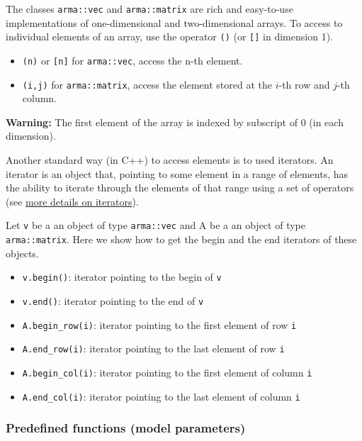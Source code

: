 The classes \texttt{arma::vec} and \texttt{arma::matrix} are rich and easy-to-use implementations of one-dimensional and two-dimensional arrays. To access to individual elements of an array, use the operator \texttt{()} (or \texttt{{[}{]}} in dimension 1).

\begin{itemize}
\tightlist
\item
  \texttt{(n)} or \texttt{{[}n{]}} for \texttt{arma::vec}, access the n-th element.
\item
  \texttt{(i,j)} for \texttt{arma::matrix}, access the element stored at the \(i\)-th row and \(j\)-th column.
\end{itemize}

\textbf{Warning:} The first element of the array is indexed by subscript of 0 (in each dimension).

Another standard way (in C++) to access elements is to used iterators. An iterator is an object that, pointing to some element in a range of elements, has the ability to iterate through the elements of that range using a set of operators (see \href{https://teuder.github.io/rcpp4everyone_en/290_iterator.html}{more details on iterators}).

Let \texttt{v} be a an object of type \texttt{arma::vec} and A be a an object of type \texttt{arma::matrix}. Here we show how to get the begin and the end iterators of these objects.

\begin{itemize}
\tightlist
\item
  \texttt{v.begin()}: iterator pointing to the begin of \texttt{v}
\item
  \texttt{v.end()}: iterator pointing to the end of \texttt{v}
\item
  \texttt{A.begin\_row(i)}: iterator pointing to the first element of row \texttt{i}
\item
  \texttt{A.end\_row(i)}: iterator pointing to the last element of row \texttt{i}
\item
  \texttt{A.begin\_col(i)}: iterator pointing to the first element of column \texttt{i}
\item
  \texttt{A.end\_col(i)}: iterator pointing to the last element of column \texttt{i}
\end{itemize}

\hypertarget{cppIBMfunctions}{%
\subsubsection{Predefined functions (model parameters)}\label{cppIBMfunctions}}

